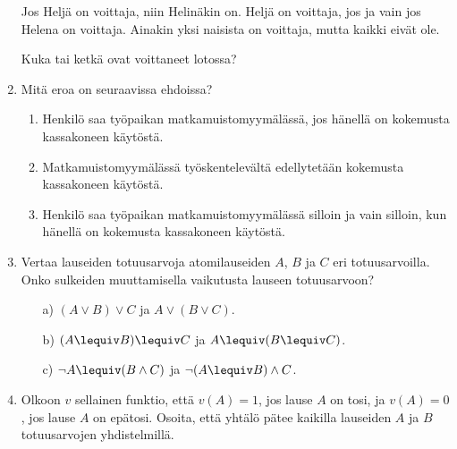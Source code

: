 \begin{enumerate}
Jos Heljä on voittaja, niin Helinäkin on. 
Heljä on voittaja, jos ja vain jos Helena on voittaja.
Ainakin yksi naisista on voittaja, mutta kaikki eivät ole.

Kuka tai ketkä ovat voittaneet lotossa?

\item
Mitä eroa on seuraavissa ehdoissa?
\begin{enumerate}
\item Henkilö saa työpaikan matkamuistomyymälässä, jos hänellä on kokemusta kassakoneen käytöstä.
\item Matkamuistomyymälässä työskentelevältä edellytetään kokemusta kassakoneen käytöstä.
\item 
Henkilö saa työpaikan matkamuistomyymälässä silloin ja vain silloin, kun hänellä on kokemusta kassakoneen käytöstä.
\end{enumerate}


\item
Vertaa lauseiden totuusarvoja atomilauseiden $A$, $B$ ja $C$ eri totuusarvoilla. Onko sulkeiden muuttamisella vaikutusta lauseen totuusarvoon?

\begin{itemize}

\item[a)] $(A\lor B)\lor C$ ja $A\lor (B\lor C)$.

\item[b)] $(A\lequiv B)\lequiv C$ ja $A\lequiv (B\lequiv C)$.

\item[c)] $\lnot A \lequiv (B \land C)$ ja $\lnot (A \lequiv B) \land C$.

\end{itemize}


\item
Olkoon $v$ sellainen funktio, että $v(A) = 1$, jos lause $A$ on tosi, ja $v(A) = 0$, jos lause $A$ on epätosi. Osoita, että yhtälö pätee kaikilla lauseiden $A$ ja $B$ totuusarvojen yhdistelmillä.


\end{enumerate}
